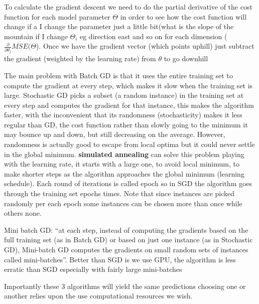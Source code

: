 \documentclass[12pt]{report}
\begin{document}
To calculate the gradient descent we need to do the partial derivative of the cost function for each model parameter $\Theta$ in order to see how the cost function will change if a I change the parameter just a little bit(what is the slope of the mountain if I change $\Theta_i$ eg direction east and so on for each dimension ($\frac{\partial}{\partial \theta_j} MSE(\Theta$). Once we have the gradient vector (which points uphill) just subtract the gradient (weighted by the learning rate) from $\theta$ to go downhill

The main problem with Batch GD is that it uses the entire training set to compute the gradient at every step, which makes it slow when the training set is large. Stochastic GD picks a subset (a random instance) in the training set at every step and computes the gradient for that instance, this makes the algorithm faster, with the inconvenient that its randomness (stochasticity) makes it less regular than GD, the cost function rather than slowly going to the minimum it may bounce up and down, but still decreasing on the average. However, randomness is actually good to escape from local optima but it could never settle in the global minimum.
\textbf{simulated annealing} can solve this problem playing with the learning rate, it starts with a large one, to avoid local minimum, to make shorter steps as the algorithm approaches the global minimum (learning schedule).
Each round of iterations is called epoch so in SGD the algorithm goes through the training set epochs times. Note that since instances are picked randomly per each epoch some instances can be chosen more than once while others none.

Mini batch GD: “at each step, instead of computing the gradients based on the full training set (as in Batch GD) or based on just one instance (as in Stochastic GD), Mini-batch GD computes the gradients on small random sets of instances called mini-batches”. Better than SGD is we use GPU, the algorithm is less erratic than SGD especially with fairly large mini-batches

Importantly these 3 algorithms will yield the same predictions choosing one or another relies upon the use computational resources we wish.
\end{document}
